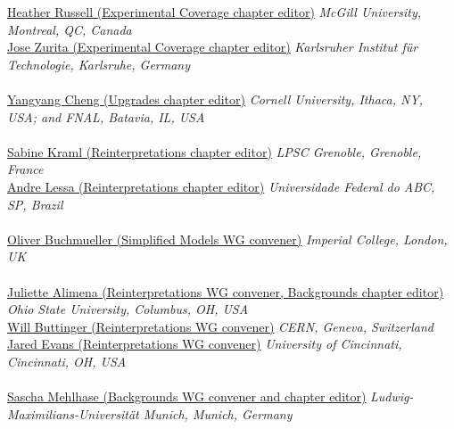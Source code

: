 \noindent\href{mailto:heather.russell@cern.ch}{Heather Russell (Experimental Coverage chapter editor)}
\emph{McGill University, Montreal, QC, Canada}\\

\noindent\href{mailto:jose.zurita@kit.edu}{Jose Zurita (Experimental Coverage chapter editor)}
\emph{Karlsruher Institut f\"{u}r Technologie, Karlsruhe, Germany}\\

\text{ \; }\\

\noindent\href{mailto:yangyangchng@gmail.com}{Yangyang Cheng (Upgrades chapter editor)}
\emph{Cornell University, Ithaca, NY, USA; and FNAL, Batavia, IL, USA}\\

\text{ \; }\\

\noindent\href{mailto:sabine.kraml@lpsc.in2p3.fr}{Sabine Kraml (Reinterpretations chapter editor)}
\emph{LPSC Grenoble, Grenoble, France}\\

\noindent\href{mailto:andre.lessa@ufabc.edu.br}{Andre Lessa (Reinterpretations chapter editor)}
\emph{Universidade Federal do ABC, SP, Brazil}\\

\text{ \; }\\

\noindent\href{mailto:o.buchmueller@imperial.ac.uk}{Oliver Buchmueller (Simplified Models WG convener)} 
\emph{Imperial College, London, UK}\\

\text{ \; }\\

\noindent\href{mailto:juliette.alimena@cern.ch }{Juliette Alimena (Reinterpretations WG convener, Backgrounds chapter editor)}
\emph{Ohio State University, Columbus, OH, USA}\\

\noindent\href{mailto:William.Buttinger@cern.ch}{Will Buttinger (Reinterpretations WG convener)}
\emph{CERN, Geneva, Switzerland}\\

\noindent\href{mailto:jaevans@ucdavis.edu}{Jared Evans (Reinterpretations WG convener)} 
\emph{University of Cincinnati, Cincinnati, OH, USA}\\

\text{ \; }\\

\noindent\href{mailto:sascha.mehlhase@cern.ch}{Sascha Mehlhase (Backgrounds WG convener and chapter editor)} 
\emph{Ludwig-Maximilians-Universit\"{a}t Munich, Munich, Germany}\\

